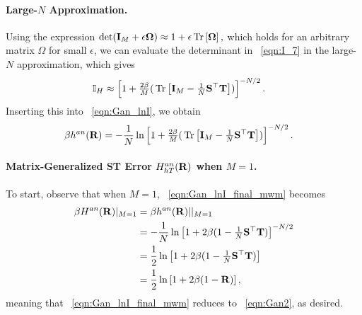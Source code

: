 \paragraph{Large-$N$ Approximation.}
Using the expression
$
\det(\mathbf{I}_{M}+\epsilon\mathbf{\Omega})\approx1+\epsilon\mbox{}\operatorname{Tr}\left[\mathbf{\Omega}\right]  ,
$
which holds for an arbitrary matrix $\Omega$ for small $\epsilon$,
we can evaluate the determinant in \EQN~\ref{eqn:I_7} in the large-$N$ approximation, 
which gives
\begin{align}
  \label{eqn:I_8}
  \mathbb{I}_{H} &\approx  \left[1  + \tfrac{2\beta}{M}(\mbox{}\operatorname{Tr}\left[\mathbf{I}_{M}-\tfrac{1}{N}{\mathbf{S}}^{\top}{\mathbf{T}}\right])\right]^{-N/2}   .
\end{align}
Inserting this into \EQN~\ref{eqn:Gan_lnI}, we obtain
\begin{align}
\label{eqn:Gan_lnI_final_mwm}
\beta h^{an}(\mathbf{R})
   &=-\frac{1}{N}\ln \left[1  + \tfrac{2\beta}{M}(\mbox{}\operatorname{Tr}\left[\mathbf{I}_{M}-\tfrac{1}{N}{\mathbf{S}}^{\top}{\mathbf{T}}\right])\right]^{-N/2}   .
\end{align}


  
\paragraph{Matrix-Generalized ST Error $H^{an}_{hT}(\mathbf{R})$ when $M=1$.}
To start, observe that when $M=1$, \EQN~\ref{eqn:Gan_lnI_final_mwm} becomes
\begin{align}
\nonumber
\beta H^{an}(\mathbf{R})\vert_{M=1}
&= \beta h^{an}(\mathbf{R})|\vert_{M=1}  \\ 
  &=  -\frac{1}{N}\ln  \left[1  + 2\beta(1-\tfrac{1}{N}{\mathbf{S}}^{\top}{\mathbf{T}})\right]^{-N/2} \\ 
\nonumber
  &= \frac{1}{2}\ln  \left[1  + 2\beta(1-\tfrac{1}{N}{\mathbf{S}}^{\top}{\mathbf{T}})\right] \\ 
\label{eqn:GANmat_m_equals_1}
  &=  \frac{1}{2}\ln \left[1 + 2\beta(1-\mathbf{R})\right]  ,
\end{align}
meaning that \EQN~\ref{eqn:Gan_lnI_final_mwm} reduces to \EQN~\ref{eqn:Gan2}, as desired.


